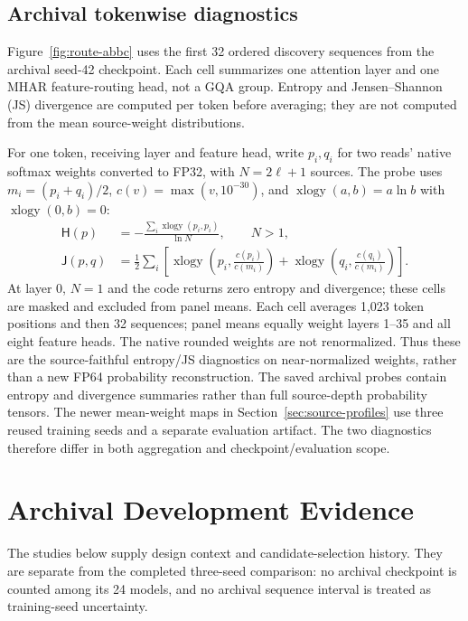 \documentclass[11pt,letterpaper]{article}
\begin{document}
\subsection{Archival tokenwise diagnostics}
\label{app:route-profiles}
Figure~\ref{fig:route-abbc} uses the first 32 ordered discovery sequences
from the archival seed-42 checkpoint. Each cell summarizes one attention
layer and one MHAR feature-routing head, not a GQA group. Entropy and
Jensen--Shannon (JS) divergence are computed per token before averaging;
they are not computed from the mean source-weight distributions.

For one token, receiving layer and feature head, write $p_i,q_i$ for two
reads' native softmax weights converted to FP32, with $N=2\ell+1$ sources.
The probe uses $m_i=(p_i+q_i)/2$, $c(v)=\max(v,10^{-30})$, and
$\operatorname{xlogy}(a,b)=a\ln b$ with $\operatorname{xlogy}(0,b)=0$:
\begin{align}
 \mathsf H(p)&=-\frac{\sum_i\operatorname{xlogy}(p_i,p_i)}{\ln N},
       \qquad N>1,\\
 \mathsf J(p,q)&=\frac12\sum_i\left[
   \operatorname{xlogy}\!\left(p_i,\frac{c(p_i)}{c(m_i)}\right)
  +\operatorname{xlogy}\!\left(q_i,\frac{c(q_i)}{c(m_i)}\right)\right].
 \label{eq:archival-diagnostics}
\end{align}
At layer 0, $N=1$ and the code returns zero entropy and divergence; these
cells are masked and excluded from panel means. Each cell averages 1,023
token positions and then 32 sequences; panel means equally weight layers
1--35 and all eight feature heads. The native rounded weights are not
renormalized. Thus these are the source-faithful entropy/JS diagnostics
on near-normalized weights, rather than a new FP64 probability reconstruction.
The saved archival probes contain entropy and divergence summaries rather
than full source-depth probability tensors. The newer mean-weight maps in
Section~\ref{sec:source-profiles} use three reused training seeds and a
separate evaluation artifact. The two diagnostics therefore differ in both
aggregation and checkpoint/evaluation scope.

\section{Archival Development Evidence}
\label{sec:results}
The studies below supply design context and candidate-selection history.
They are separate from the completed three-seed comparison: no archival
checkpoint is counted among its 24 models, and no archival sequence interval
is treated as training-seed uncertainty.
\end{document}
